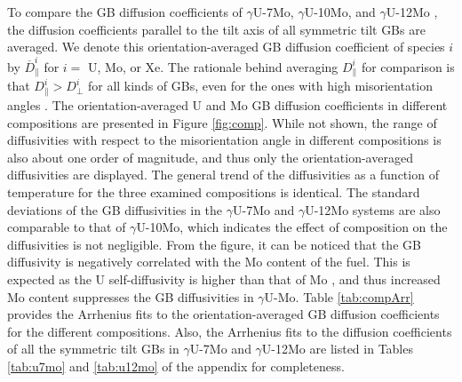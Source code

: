 \documentclass{elsarticle}
\providecommand{\DIFadd}[1]{{\protect\color{blue} \sf #1}} %
\providecommand{\DIFdel}[1]{}
\providecommand{\DIFaddbegin}{} %
\providecommand{\DIFaddend}{} %
\providecommand{\DIFdelbegin}{} %
\providecommand{\DIFdelend}{} %
\begin{document}
\DIFadd{To compare the GB diffusion coefficients of }\DIFaddend $\gamma$U-7Mo, $\gamma$U-10Mo, and $\gamma$U-12Mo\DIFdelbegin \DIFdel{are shown in }\DIFdelend \DIFaddbegin \DIFadd{, the diffusion coefficients parallel to the tilt axis of all symmetric tilt GBs are averaged. We denote this orientation-averaged GB diffusion coefficient of species $i$ by $\overline{D}^i_{\parallel}$ for $i=$ U, Mo, or Xe. The rationale behind averaging $D^i_{\parallel}$ for comparison is that $D^i_{\parallel} > D^i_{\perp}$ for all kinds of GBs, even for the ones with high misorientation angles \cite{mishin2015}. The orientation-averaged U and Mo GB diffusion coefficients in different compositions are presented in }\DIFaddend Figure \ref{fig:comp}. While not shown, the range of diffusivities with respect to \DIFdelbegin \DIFdel{misorientation angles }\DIFdelend \DIFaddbegin \DIFadd{the misorientation angle }\DIFaddend in different compositions is also \DIFdelbegin \DIFdel{within }\DIFdelend \DIFaddbegin \DIFadd{about }\DIFaddend one order of magnitude, and thus only \DIFaddbegin \DIFadd{the }\DIFaddend orientation-averaged diffusivities are displayed. \DIFaddbegin \DIFadd{The general trend of the diffusivities as a function of temperature for the three examined compositions is identical. The standard deviations of the GB diffusivities in the $\gamma$U-7Mo and $\gamma$U-12Mo systems are also comparable to that of $\gamma$U-10Mo, which indicates the effect of composition on the diffusivities is not negligible. }\DIFaddend From the figure, it can be noticed that the \DIFaddbegin \DIFadd{GB }\DIFaddend diffusivity is negatively correlated with the Mo content of the fuel. This is \DIFdelbegin \DIFdel{somewhat }\DIFdelend expected as the U self-diffusivity is higher than that of Mo \cite{huang2013}, and \DIFaddbegin \DIFadd{thus }\DIFaddend increased Mo content suppresses \DIFdelbegin \DIFdel{self-diffusivity }\DIFdelend \DIFaddbegin \DIFadd{the GB diffusivities }\DIFaddend in $\gamma$U-Mo. \DIFdelbegin \DIFdel{The general trend as a function of the temperature of the diffusivity for the three examined compositions is identical. The standard deviations for the U-7Mo and U-12Mo systems are comparable to that of U-10Mo, which indicates that the trend observed with composition is statistically significant. }\DIFdelend Table \ref{tab:compArr} provides the Arrhenius \DIFdelbegin \DIFdel{parameters }\DIFdelend \DIFaddbegin \DIFadd{fits to the orientation-averaged GB diffusion coefficients }\DIFaddend for the different compositions. Also, the \DIFdelbegin \DIFdel{total GB diffusion coefficients for different tilts and temperatures }\DIFdelend \DIFaddbegin \DIFadd{Arrhenius fits to the diffusion coefficients of all the symmetric tilt GBs }\DIFaddend in $\gamma$U-7Mo and $\gamma$U-12Mo are listed in Tables \ref{tab:u7mo} and \ref{tab:u12mo} of the appendix for completeness.
\end{document}

